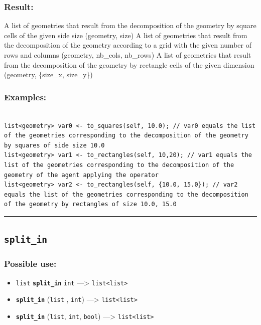 \documentclass[]{book}
\providecommand{\tightlist}{%
  \setlength{\itemsep}{0pt}\setlength{\parskip}{0pt}}
\theoremstyle{definition}
\theoremstyle{definition}
\theoremstyle{definition}
\theoremstyle{remark}
\begin{document}
\subsubsection{Result:}\label{result-477}

A list of geometries that result from the decomposition of the geometry
by square cells of the given side size (geometry, size) A list of
geometries that result from the decomposition of the geometry according
to a grid with the given number of rows and columns (geometry, nb\_cols,
nb\_rows) A list of geometries that result from the decomposition of the
geometry by rectangle cells of the given dimension (geometry, \{size\_x,
size\_y\})

\subsubsection{Examples:}\label{examples-344}

\begin{verbatim}
 
list<geometry> var0 <- to_squares(self, 10.0); // var0 equals the list of the geometries corresponding to the decomposition of the geometry by squares of side size 10.0 
list<geometry> var1 <- to_rectangles(self, 10,20); // var1 equals the list of the geometries corresponding to the decomposition of the geometry of the agent applying the operator 
list<geometry> var2 <- to_rectangles(self, {10.0, 15.0}); // var2 equals the list of the geometries corresponding to the decomposition of the geometry by rectangles of size 10.0, 15.0
\end{verbatim}

\begin{center}\rule{0.5\linewidth}{\linethickness}\end{center}

\subsection{\texorpdfstring{\texttt{split\_in}}{split\_in}}\label{split_in}

\subsubsection{Possible use:}\label{possible-use-494}

\begin{itemize}
\tightlist
\item
  \texttt{list} \textbf{\texttt{split\_in}} \texttt{int}
  ---\textgreater{} \texttt{list\textless{}list\textgreater{}}
\item
  \textbf{\texttt{split\_in}} (\texttt{list} , \texttt{int})
  ---\textgreater{} \texttt{list\textless{}list\textgreater{}}
\item
  \textbf{\texttt{split\_in}} (\texttt{list}, \texttt{int},
  \texttt{bool}) ---\textgreater{}
  \texttt{list\textless{}list\textgreater{}}
\end{itemize}
\end{document}
